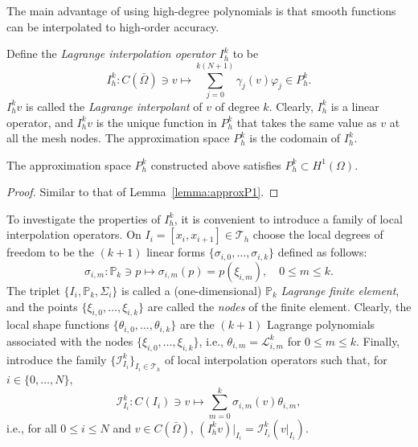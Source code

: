 The main advantage of using high-degree polynomials is that smooth functions can be interpolated to high-order accuracy.
\begin{definition}\label{def:interpolation-operator-Phk}
    Define the \emph{Lagrange interpolation operator} $I_h^k$ to be
    \begin{equation}\label{eq:interpolation-operator-Phk}
        I_h^k: C(\bar{\Omega}) \ni v \mapsto \sum_{j=0}^{k(N+1)} \gamma_j(v) \varphi_j \in P_h^k.
    \end{equation}
    $I_h^k v$ is called the \emph{Lagrange interpolant} of $v$ of degree $k$. Clearly, $I_h^k$ is a linear operator, and $I_h^k v$ is the unique function in $P_h^k$ that takes the same value as $v$ at all the mesh nodes. The approximation space $P_h^k$ is the codomain of $I_h^k$. 
\end{definition}
\begin{lemma}\label{lemma:approxPk}
    The approximation space $P_h^k$ constructed above satisfies $P_h^k \subset H^1(\Omega)$.
\begin{proof}
    Similar to that of Lemma~\ref{lemma:approxP1}.
\end{proof}
\end{lemma}
To investigate the properties of $I_h^k$, it is convenient to introduce a family of local interpolation operators. On $I_i = [x_i, x_{i+1}] \in \mathcal{T}_h$ choose the local degrees of freedom to be the $(k+1)$ linear forms $\{\sigma_{i,0}, \dots, \sigma_{i,k}\}$ defined as follows:
\begin{equation}
    \sigma_{i,m}: \mathbb{P}_k \ni p \mapsto \sigma_{i,m}(p) = p(\xi_{i,m}), \quad 0 \le m \le k.
\end{equation}
The triplet $\{I_i, \mathbb{P}_k, \Sigma_i\}$ is called a (one-dimensional) $\mathbb{P}_k$ \emph{Lagrange finite element}, and the points $\{\xi_{i,0}, \dots, \xi_{i,k}\}$ are called the \emph{nodes} of the finite element. Clearly, the local shape functions $\{\theta_{i,0}, \dots, \theta_{i,k}\}$ are the $(k+1)$ Lagrange polynomials associated with the nodes $\{\xi_{i,0}, \dots, \xi_{i,k}\}$, i.e., $\theta_{i,m} = \mathcal{L}_{i,m}^k$ for $0 \le m \le k$. Finally, introduce the family $\{\mathcal{I}_{I_i}^k\}_{I_i \in \mathcal{T}_h}$ of local interpolation operators such that, for $i \in \{0, \dots, N\}$,
\begin{equation}
    \mathcal{I}_{I_i}^k: C(I_i) \ni v \mapsto \sum_{m=0}^k \sigma_{i,m}(v) \theta_{i,m},
\end{equation}
i.e., for all $0 \le i \le N$ and $v \in C(\bar{\Omega})$, $(I_h^k v)|_{I_i} = \mathcal{I}_{I_i}^k(v|_{I_i})$.

